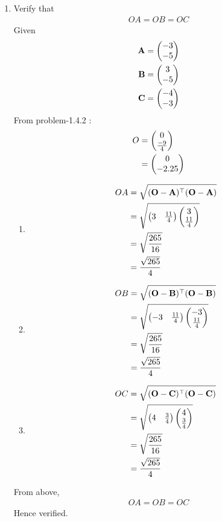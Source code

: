 \documentclass[11pt]{book}
\begin{document}
\begin{enumerate}[label=\thesection.\arabic*.,ref=\thesection.\theenumi]
\item Verify that 
\begin{align}
OA = OB = OC 
\end{align} 
\solution
Given \begin{align}
\mathbf{A} &= \begin{pmatrix}-3\\-5\end{pmatrix}\\
\mathbf{B} &= \begin{pmatrix}3\\-5\end{pmatrix}\\
\mathbf{C} &= \begin{pmatrix}-4\\-3\end{pmatrix}
\end{align}
From problem-1.4.2 :
\begin{align}
O &= \begin{pmatrix}0 \\ \frac{-9}{4}\end{pmatrix}\\
 &= \begin{pmatrix}0\\ -2.25\end{pmatrix}
\end{align}
\begin{enumerate}
\item 
\begin{align}
OA &= \sqrt{(\mathbf{O}-\mathbf{A})^{\top}(\mathbf{O}-\mathbf{A})}\\
&= \sqrt{\begin{pmatrix}3 & \frac{11}{4}\end{pmatrix} \begin{pmatrix}3\\ \frac{11}{4}\end{pmatrix}}\\
 &= \sqrt{\frac{265}{16}}\\
 &= \frac{\sqrt{265}}{4}
\end{align}
\item 
\begin{align}
OB &= \sqrt{(\mathbf{O}-\mathbf{B})^{\top}(\mathbf{O}-\mathbf{B})}\\
 &= \sqrt{\begin{pmatrix}-3 & \frac{11}{4}\end{pmatrix} \begin{pmatrix}-3\\ \frac{11}{4}\end{pmatrix}}\\
 &= \sqrt{\frac{265}{16}}\\
 &= \frac{\sqrt{265}}{4}
\end{align}
\item 
\begin{align}
OC &= \sqrt{(\mathbf{O}-\mathbf{C})^{\top}(\mathbf{O}-\mathbf{C})}\\
 &= \sqrt{\begin{pmatrix}4 & \frac{3}{4}\end{pmatrix}  \begin{pmatrix}4\\ \frac{3}{4}\end{pmatrix}}\\
 &= \sqrt{\frac{265}{16}}\\
 &= \frac{\sqrt{265}}{4}
\end{align}
\end{enumerate}
From above, 
\begin{align}
OA = OB = OC
\end{align}
Hence verified.


\end{enumerate}
\end{document}
